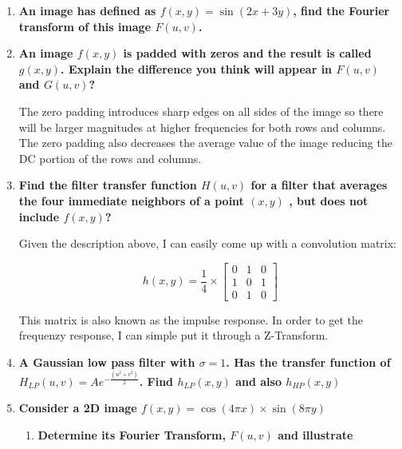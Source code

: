 \begin{enumerate}[font=\bfseries]

    \item \textbf{An image has defined as  $f(x,y) = \sin(2x + 3y)$, find the Fourier transform of
    this image $F(u,v)$.}

    \item \textbf{An image $f( x,y)$ is padded with zeros and the result is
    called $g(x,y)$.  Explain the difference you think will appear in $F(u,v)$
    and $G(u,v)$?}

    The zero padding introduces sharp edges on all sides of the image so there
    will be larger magnitudes at higher frequencies for both rows and columns.
    The zero padding also decreases the average value of the image reducing the
    DC portion of the rows and columns.

    \item \textbf{Find the filter transfer function $H(u,v)$ for a filter that
    averages the four immediate neighbors of a point $(x,y)$ , but does not
    include $f(x,y)$?}

    Given the description above, I can easily come up with a convolution matrix:
    
    \begin{equation*}
	h(x,y) = \frac{1}{4} \times
	\begin{bmatrix}
	    0 & 1 & 0 \\
	    1 & 0 & 1 \\
	    0 & 1 & 0
	\end{bmatrix}
    \end{equation*}

    This matrix is also known as the impulse response. In order to get the
    frequenzy response, I can simple put it through a Z-Transform.

    \item \textbf{A Gaussian low pass filter with $\sigma = 1$. Has the transfer
    function of $H_{LP}(u,v) = Ae^{-\frac{(u^2 + v^2)}{2}}$.
    Find $h_{LP}(x,y)$ and also $h_{HP}(x,y)$}

    \item \textbf{Consider a 2D image $f(x,y) = \cos(4\pi x)\times \sin(8\pi y)$}

    \begin{enumerate}[font=\bfseries, label=\alph*.]

	\item \textbf{Determine its Fourier Transform, $F(u,v)$ and illustrate}


\end{enumerate}
\end{enumerate}
